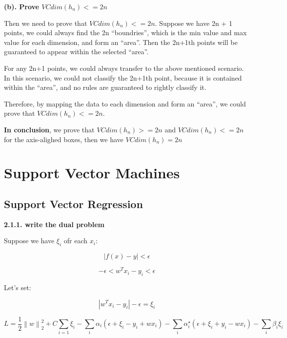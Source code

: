 \documentclass{article} %
\newcommand{\norm}[1]{\left\lVert #1 \right\rVert}
\newcommand{\abs}[1]{\left\lvert #1 \right\rvert}
\begin{document}
\textbf{(b). Prove $VCdim(h_n) <= 2n$}

Then we need to prove that $VCdim(h_n) <= 2n$. Suppose we have 2n + 1 points, we
could always find the 2n ``boundries'', which is the min value and max value for
each dimension, and form an ``area''. Then the 2n+1th points will be guaranteed to
appear within the selected ``area''.

For any 2n+1 points, we could always transfer to the above mentioned scenario. In
this scenario, we could not classify the 2n+1th point, because it is contained
within the ``area'', and no rules are guaranteed to rightly classify it.

Therefore, by mapping the data to each dimension and form an ``area'', we could
prove that $VCdim(h_n) <= 2n$.

\textbf{In conclusion}, we prove that $VCdim(h_n) >= 2n$ and $VCdim(h_n) <= 2n$ for the
axis-alighed boxes, then we have $VCdim(h_n) = 2n$



\section{Support Vector Machines}


\subsection{Support Vector Regression}

\textbf{2.1.1. write the dual problem}

Suppose we have $\xi_i$ ofr each $x_i$:

\begin{equation}
\abs{f(x) - y} < \epsilon
\end{equation}

\begin{equation}
- \epsilon  < w^T x_i - y_i < \epsilon
\end{equation}

Let's set:

\begin{equation}
\abs{w^T x_i - y_i} - \epsilon = \xi_i
\end{equation}

\begin{equation}
L = \frac{1}{2} \norm{w}_2^2 + C \sum_{i=1} \xi_i 
- \sum_i \alpha_i (\epsilon + \xi_i - y_i + w x_i)
- \sum_i \alpha_i^{\star} (\epsilon + \xi_i +y_i - w x_i)
- \sum_i \beta_i \xi_i
\end{equation}
\end{document}
